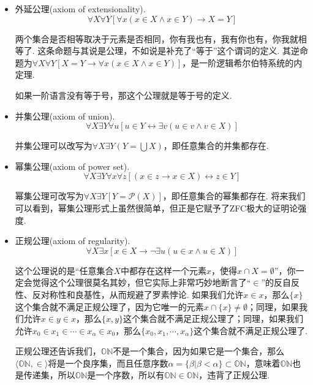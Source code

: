 \begin{itemize}

    \item[(1)] 外延公理(axiom of extensionality).
    \[\forall X \forall Y[\forall x(x \in X \wedge x \in Y) \rightarrow X=Y]\]
    \begin{note}
        两个集合是否相等取决于元素是否相同，你有我也有，我有你也有，你我就相等了. 这条命题与其说是公理，不如说是补充了“等于”这个谓词的定义. 其逆命题为\(\forall X \forall Y[X=Y \rightarrow \forall x(x \in X \wedge x \in Y)]\)，是一阶逻辑希尔伯特系统的内定理. 

        如果一阶语言没有等于号，那这个公理就是等于号的定义.
    \end{note}

    \item[(2)] 并集公理(axiom of union).
    \[\forall X \exists Y \forall u[u \in Y \leftrightarrow \exists v(u \in v \wedge v \in X)]\]
    \begin{note}
        并集公理可以改写为\(\displaystyle{\forall X \exists Y(Y=\bigcup X)}\)，即任意集合的并集都存在.
    \end{note}

    \item[(3)] 幂集公理(axiom of power set).
    \[\forall X \exists Y \forall x\forall z[(x \in z \rightarrow x \in X) \leftrightarrow z \in Y]\]
    \begin{note}
        幂集公理可改写为\(\forall X \exists Y[Y=\mathcal{P}(X)]\)，即任意集合的幂集都存在. 将来我们可以看到，幂集公理形式上虽然很简单，但正是它赋予了\textsf{ZFC}极大的证明论强度.
    \end{note}

    \item[(4)] 正规公理(axiom of regularity).
    \[\forall X \exists x[x \in X \rightarrow \neg\exists u(u \in x \wedge u \in X)]\]
    \begin{note}
        这个公理说的是“任意集合\(X\)中都存在这样一个元素\(x\)，使得\(x \cap X=\emptyset\)”，你一定会觉得这个公理很莫名其妙，但它实际上非常巧妙地断言了“\(\in\)”的反自反性、反对称性和良基性，从而规避了罗素悖论. 如果我们允许\(x \in x\)，那么\(\{x\}\)这个集合就不满足正规公理了，因为它唯一的元素\(x \cap \{x\} \neq \emptyset\)；同理，如果我们允许\(x \in y \in x\)，那么\(\{x,y\}\)这个集合就不满足正规公理了；同理，如果我们允许\(x_0 \in x_1 \in \cdots \in x_\alpha \in x_0\)，那么\(\{x_0,x_1,\cdots,x_\alpha\}\)这个集合就不满足正规公理了.

        正规公理还告诉我们，\(\mathbb{ON}\)不是一个集合，因为如果它是一个集合，那么\(\langle \mathbb{ON}, \in \rangle\)将是一个良序集，而且任意序数\(\alpha=\{\beta|\beta < \alpha\} \subset \mathbb{ON}\)，意味着\(\mathbb{ON}\)也是传递集，所以\(\mathbb{ON}\)是一个序数，所以有\(\mathbb{ON} \in \mathbb{ON}\)，违背了正规公理. 


\end{note}
\end{itemize}
